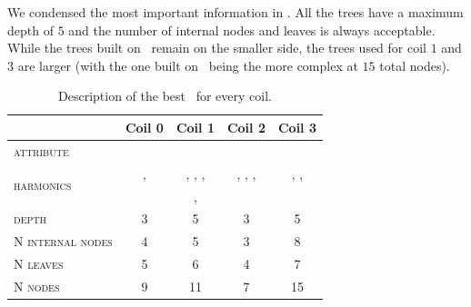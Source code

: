 We condensed the most important information in . All the trees have a
maximum depth of $5$ and the number of internal nodes and leaves is always acceptable. While the
trees built on \an\ remain on the smaller side, the trees used for coil $1$ and $3$ are larger (with
the one built on \cnmod\ being the more complex at $15$ total nodes).
\begin{table}[!ht]
	\caption{Description of the best \dt\ for every coil.}\label{tbl:tree-description}

	\bigskip
	\setlength{\tabcolsep}{6pt}
	\centering
	\begin{tabular}{lcccc}
		\toprule
		\textbf{}                           & \textbf{Coil 0}  & \textbf{Coil 1}          & \textbf{Coil 2}          & \textbf{Coil 3}
		\\
		\midrule
		\textsc{attribute}                  & \an              & \bn                      & \an                      & \cnmod                          \\
		\multirow{2}{*}{\textsc{harmonics}} & \an[2], \an[3]   & \bn[3], \bn[4], \bn[10], & \an[1], \an[2], \an[12], & \cnmod[1], \cnmod[6], \cnmod[7] \\
		                                    &
		                                    & \bn[11], \bn[13] & \an[15]                  &                                                            \\
		\textsc{depth}                      & 3                & 5
		                                    & 3                & 5                                                                                     \\
		\textsc{N internal nodes}           & 4                & 5
		                                    & 3                & 8                                                                                     \\
		\textsc{N leaves}                   & 5                & 6
		                                    & 4                & 7                                                                                     \\
		\textsc{N nodes}                    & 9                & 11
		                                    & 7                & 15                                                                                    \\
		\bottomrule
	\end{tabular}
\end{table}

